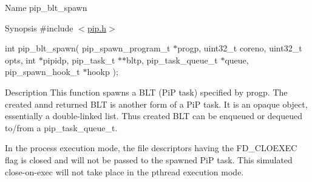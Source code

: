 \begin{DoxyParagraph}{Name}
pip\-\_\-blt\-\_\-spawn
\end{DoxyParagraph}
\begin{DoxyParagraph}{Synopsis}
\#include $<$\hyperlink{pip_8h_source}{pip.\-h}$>$ \par
int pip\-\_\-blt\-\_\-spawn( pip\-\_\-spawn\-\_\-program\-\_\-t $\ast$progp, uint32\-\_\-t coreno, uint32\-\_\-t opts, int $\ast$pipidp, pip\-\_\-task\-\_\-t $\ast$$\ast$bltp, pip\-\_\-task\-\_\-queue\-\_\-t $\ast$queue, pip\-\_\-spawn\-\_\-hook\-\_\-t $\ast$hookp );
\end{DoxyParagraph}
\begin{DoxyParagraph}{Description}
This function spawns a B\-L\-T (Pi\-P task) specified by {\ttfamily progp}. The created annd returned B\-L\-T is another form of a Pi\-P task. It is an opaque object, essentially a double-\/linked list. Thus created B\-L\-T can be enqueued or dequeued to/from a {\ttfamily pip\-\_\-task\-\_\-queue\-\_\-t}. 
\end{DoxyParagraph}
\begin{DoxyParagraph}{}
In the process execution mode, the file descriptors having the {\ttfamily F\-D\-\_\-\-C\-L\-O\-E\-X\-E\-C} flag is closed and will not be passed to the spawned Pi\-P task. This simulated close-\/on-\/exec will not take place in the pthread execution mode.
\end{DoxyParagraph}

